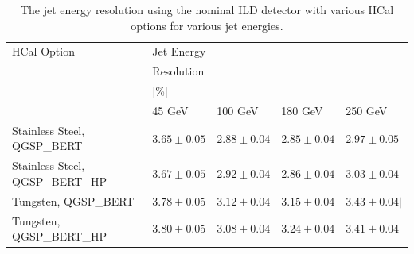 \begin{table}[h!]
\centering
\begin{tabular}{ l l l l l }
\hline
HCal Option & Jet Energy & & & \\
 & Resolution & & & \\
 & [\%] & & & \\
 & 45 GeV & 100 GeV & 180 GeV & 250 GeV \\
\hline
Stainless Steel, QGSP\_BERT & $3.65 \pm 0.05$ &$2.88 \pm 0.04$ &$2.85 \pm 0.04$ &$2.97 \pm 0.05$ \\
Stainless Steel, QGSP\_BERT\_HP & $3.67 \pm 0.05$ &$2.92 \pm 0.04$ &$2.86 \pm 0.04$ &$3.03 \pm 0.04$ \\
Tungsten, QGSP\_BERT & $3.78 \pm 0.05$ & $3.12 \pm 0.04$ & $3.15 \pm 0.04$ & $3.43 \pm 0.04 |$ \\
Tungsten, QGSP\_BERT\_HP & $3.80 \pm 0.05$ & $3.08 \pm 0.04$ & $3.24 \pm 0.04$ & $3.41 \pm 0.04$ \\
\hline
\end{tabular}
\caption[The jet energy resolution using the nominal ILD detector with various HCal options for various jet energies.]{The jet energy resolution using the nominal ILD detector with various HCal options for various jet energies.}
\label{table:jerhcalabsmaterial}
\end{table}

